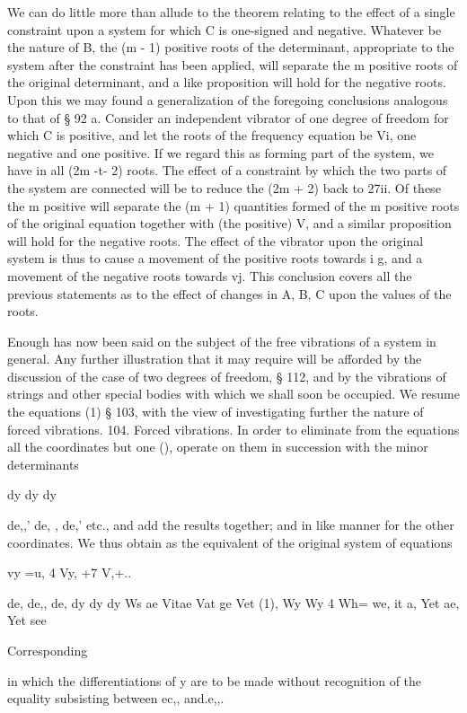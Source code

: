 We can do little more than allude to the theorem relating to
the effect of a single constraint upon a system for which C is
one-signed and negative. Whatever be the nature of B, the
(m - 1) positive roots of the determinant, appropriate to the
system after the constraint has been applied, will separate the m
positive roots of the original determinant, and a like proposition
will hold for the negative roots. Upon this we may found a
generalization of the foregoing conclusions analogous to that
of § 92 a. Consider an independent vibrator of one degree of
freedom for which C is positive, and let the roots of the frequency
equation be Vi, one negative and one positive. If we regard
this as forming part of the system, we have in all (2m -t- 2) roots.
The effect of a constraint by which the two parts of the system
are connected will be to reduce the (2m + 2) back to 27ii. Of
these the m positive will separate the (m + 1) quantities formed
of the m positive roots of the original equation together with
(the positive) V, and a similar proposition will hold for the negative
roots. The effect of the vibrator upon the original system is thus
to cause a movement of the positive roots towards i g, and a
movement of the negative roots towards vj. This conclusion
covers all the previous statements as to the effect of changes in
A, B, C upon the values of the roots.

Enough has now been said on the subject of the free vibrations of a system in
general. Any further illustration that it
may require will be afforded by the discussion of the case of two
degrees of freedom, § 112, and by the vibrations of strings and other
special bodies with which we shall soon be occupied. We resume
the equations (1) § 103, with the view of investigating further the
nature of forced vibrations.
104. Forced vibrations.  In order to eliminate from the equations all the
coordinates but one (), operate on them in succession with the minor
determinants

dy dy dy

de,,' de, , de,' etc., and add the results together; and in like manner for the
other coordinates. We thus obtain as the equivalent of the original system of
equations

vy =u, 4 Vy, +7 V,+..

de, de,, de, dy dy dy Ws ae Vitae Vat ge Vet (1), Wy Wy 4 Wh= we, it a, Yet ae,
Yet see

Corresponding

in which the differentiations of y are to be made without recognition of the
equality subsisting between ec,, and.e,,.

